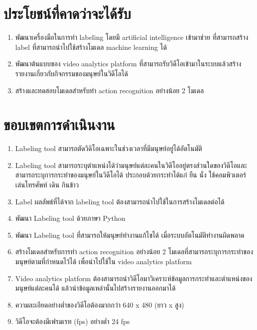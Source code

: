 \section{ประโยชน์ที่คาดว่าจะได้รับ}
\begin{enumerate}
	\setlength\itemsep{-0.25em}
	\item พัฒนาเครื่องมือในการทำ labeling โดยมี artificial intelligence เข้ามาช่วย ที่สามารถสร้าง label ที่สามารถนำไปใช้สร้างโมเดล machine learning ได้
	\item พัฒนาต้นแบบของ video analytics platform ที่สามารถรับวิดีโอเข้ามาในระบบแล้วสร้างรายงานเกี่ยวกับกิจกรรมของมนุษย์ในวิดีโอได้
	\item สร้างและทดสอบโมเดลสำหรับทำ action recognition อย่างน้อย 2 โมเดล
\end{enumerate}
\clearpage

\section{ขอบเขตการดำเนินงาน}
\begin{enumerate}
	\setlength\itemsep{-0.25em}
	\item Labeling tool สามารถตัดวิดิโอเฉพาะในช่วงเวลาที่มีมนุษย์อยู่ได้อัตโนมัติ
	\item Labeling tool สามารถระบุตำแหน่งได้ว่ามนุษย์แต่ละคนในวิดีโออยู่ตรงส่วนใดของวิดีโอและสามารถระบุการกระทำของมนุษย์ในวิดีโอได้ ประกอบด้วยกระทำได้แก่ ยืน นั่ง ใช้คอมพิวเตอร์ เล่นโทรศัพท์ เดิน กินข้าว 
	\item Label ผลลัพธ์ที่ได้จาก labeling tool ต้องสามารถนำไปใช้ในการสร้างโมเดลต่อได้
	\item พัฒนา Labeling tool ด้วยภาษา Python
	\item พัฒนา Labeling tool ที่สามารถให้มนุษย์ทำงานแก้ไขได้ เมื่อระบบอัตโนมัติทำงานผิดพลาด
	\item สร้างโมเดลสำหรับการทำ action recognition อย่างน้อย 2 โมเดลที่สามารถระบุการกระทำของมนุษย์ตามที่กำหนดไว้ได้ เพื่อนำไปใช้ใน video analytics platform
	\item Video analytics platform ต้องสามารถนำวิดีโอมาวิเคราะห์ข้อมูลการกระทำและตำแหน่งของมนุษย์แต่ละคนได้ แล้วนำข้อมูลเหล่านั้นไปสร้างรายงานออกมาได้
	\item ความละเอียดอย่างต่ำของวิดีโอต้องมากกว่า 640 x 480 (ยาว x สูง)
	\item วิดีโอจะต้องมีเฟรมเรท (fps) อย่างต่ำ 24 fps
\end{enumerate}

